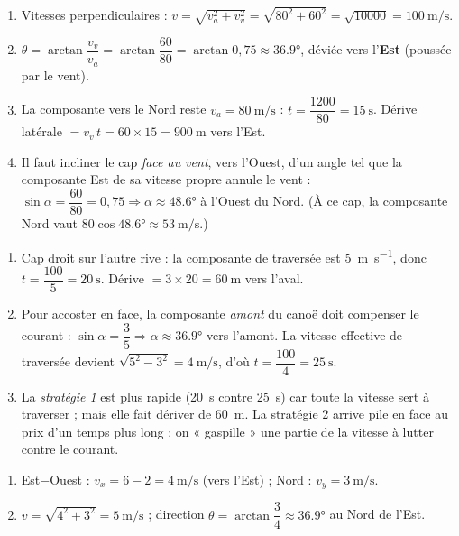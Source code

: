 \documentclass[11pt,a4paper]{article}
\begin{document}

\begin{corrige}
\begin{enumerate}[label=\alph*)]
  \item Vitesses perpendiculaires : $v=\sqrt{v_a^2+v_v^2}=\sqrt{80^2+60^2}=\sqrt{10000}=\qty{100}{\metre\per\second}$.
  \item $\theta=\arctan\dfrac{v_v}{v_a}=\arctan\dfrac{60}{80}=\arctan0{,}75\approx\ang{36,9}$, déviée vers l'\textbf{Est} (poussée par le vent).
  \item La composante vers le Nord reste $v_a=\qty{80}{\metre\per\second}$ : $t=\dfrac{1200}{80}=\qty{15}{\second}$. Dérive latérale $=v_v\,t=60\times15=\qty{900}{\metre}$ vers l'Est.
  \item Il faut incliner le cap \emph{face au vent}, vers l'Ouest, d'un angle tel que la composante Est de sa vitesse propre annule le vent : $\sin\alpha=\dfrac{60}{80}=0{,}75 \Rightarrow \alpha\approx\ang{48,6}$ à l'Ouest du Nord. (À ce cap, la composante Nord vaut $80\cos\ang{48,6}\approx\qty{53}{\metre\per\second}$.)
\end{enumerate}
\end{corrige}

\begin{corrige}
\begin{enumerate}[label=\alph*)]
  \item Cap droit sur l'autre rive : la composante de traversée est \qty{5}{\metre\per\second}, donc $t=\dfrac{100}{5}=\qty{20}{\second}$. Dérive $=3\times20=\qty{60}{\metre}$ vers l'aval.
  \item Pour accoster en face, la composante \emph{amont} du canoë doit compenser le courant : $\sin\alpha=\dfrac{3}{5}\Rightarrow\alpha\approx\ang{36,9}$ vers l'amont. La vitesse effective de traversée devient $\sqrt{5^2-3^2}=\qty{4}{\metre\per\second}$, d'où $t=\dfrac{100}{4}=\qty{25}{\second}$.
  \item La \emph{stratégie 1} est plus rapide (\qty{20}{\second} contre \qty{25}{\second}) car toute la vitesse sert à traverser ; mais elle fait dériver de \qty{60}{\metre}. La stratégie 2 arrive pile en face au prix d'un temps plus long : on « gaspille » une partie de la vitesse à lutter contre le courant.
\end{enumerate}
\end{corrige}

\begin{corrige}
\begin{enumerate}[label=\alph*)]
  \item Est$-$Ouest : $v_x=6-2=\qty{4}{\metre\per\second}$ (vers l'Est) ; Nord : $v_y=\qty{3}{\metre\per\second}$.
  \item $v=\sqrt{4^2+3^2}=\qty{5}{\metre\per\second}$ ; direction $\theta=\arctan\dfrac{3}{4}\approx\ang{36,9}$ au Nord de l'Est.
\end{enumerate}
\end{corrige}
\end{document}
